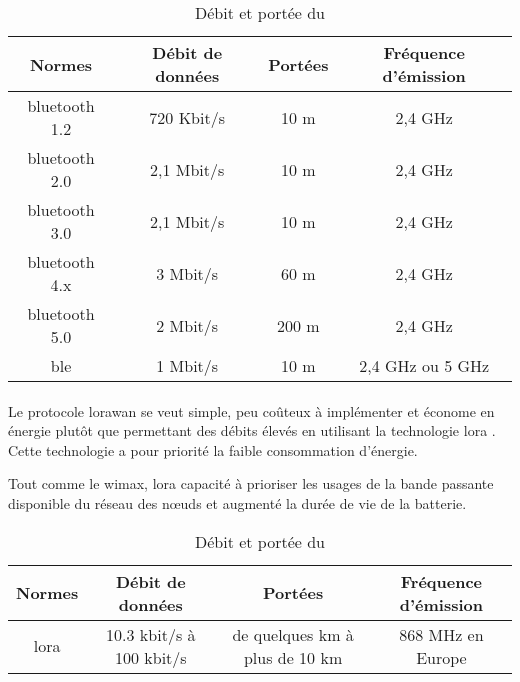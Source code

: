 \begin{table}[H]
    \centering
    \begin{tabular}{|c|c|c|c|}
        \hline
        \rowcolor{tableColorDark} Normes & Débit de données & Portées & Fréquence d'émission \\
        \hline

        \gls{bluetooth} 1.2              & 720 Kbit/s       & 10 m    & 2,4 GHz              \\\hline
        \gls{bluetooth} 2.0              & 2,1 Mbit/s       & 10 m    & 2,4 GHz              \\\hline
        \gls{bluetooth} 3.0              & 2,1 Mbit/s       & 10 m    & 2,4 GHz              \\\hline
        \gls{bluetooth} 4.x              & 3 Mbit/s         & 60 m    & 2,4 GHz              \\\hline
        \gls{bluetooth} 5.0              & 2 Mbit/s         & 200 m   & 2,4 GHz              \\\hline
        \gls{ble}                        & 1 Mbit/s         & 10 m    & 2,4 GHz ou 5 GHz     \\\hline
    \end{tabular}
    \label{tab:debitPorteeBluetooth}
    \caption{Débit et portée du }
    \nocite{ble}\nocite{debitPortee}
\end{table}

\paragraph{}
\label{sec:lorawan}

Le protocole \gls{lorawan} se veut simple, peu coûteux à implémenter et économe en énergie plutôt que permettant des débits élevés en
utilisant la technologie \gls{lora} \cite{lorawan}. Cette technologie a pour priorité la faible consommation d'énergie.\newline

Tout comme le \gls{wimax}, \gls{lora} capacité à prioriser les usages de la bande passante disponible du
réseau des nœuds et augmenté la durée de vie de la batterie.

\begin{table}[H]
    \centering
    \begin{tabular}{|c|c|c|c|}
        \hline
        \rowcolor{tableColorDark} Normes & Débit de données         & Portées                        & Fréquence d'émission \\
        \hline

        \gls{lora}                       & 10.3 kbit/s à 100 kbit/s & de quelques km à plus de 10 km & 868 MHz en Europe    \\\hline
    \end{tabular}
    \label{tab:debitPorteeLora}
    \caption{Débit et portée du }
    \nocite{debitPortee}
\end{table}

